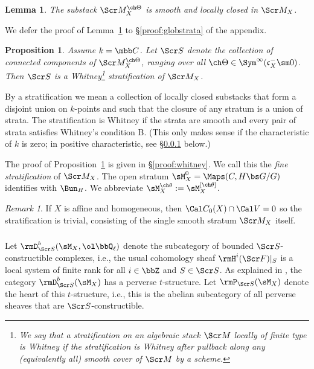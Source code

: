 \documentclass[final]{amsart}
\newtheorem{lem}[subsubsection]{Lemma}
\newtheorem{prop}[subsubsection]{Proposition}
\theoremstyle{remark}
\newtheorem{rem}[subsubsection]{Remark}
\theoremstyle{definition}
\numberwithin{equation}{section}
\begin{document}
\begin{lem} \label{lem:globstrata}
The substack $\Scr M^{\ch\Theta}_X$ is
smooth and locally closed in $\Scr M_X$. 
\end{lem}

We defer the proof of Lemma~\ref{lem:globstrata} to \S\ref{proof:globstrata} of the appendix. 

\medskip
\begin{prop} \label{prop:globwhitney}
Assume $k=\mbb C$. Let $\Scr S$ denote the collection of connected components of 
$\Scr M^{\ch\Theta}_X$, ranging over all 
$\ch\Theta \in \Sym^\infty(\mathfrak c_X^- \sm 0)$. Then $\Scr S$ 
is a Whitney\footnote{We say that a stratification on an algebraic stack $\Scr M$ locally of
finite type is Whitney if the stratification is Whitney after pullback
along any (equivalently all) smooth cover of $\Scr M$ by a scheme.} 
stratification of $\Scr M_X$. 
\end{prop}

By a stratification we mean a collection of locally closed substacks that form a
disjoint union on $k$-points and such that the closure of any stratum is a union of
strata. The stratification is Whitney if the strata are smooth and
every pair of strata satisfies Whitney's condition B. (This only makes sense
if the characteristic of $k$ is zero; in positive characteristic, see 
\S \ref{sect:whitneyperverse} below.)

\smallskip

The proof of Proposition~\ref{prop:globwhitney} is given in \S\ref{proof:whitney}. 
We call this the \emph{fine stratification} of $\Scr M_X$. 
The open stratum $\sM_X^0 = \Maps(C, H\bs G/G)$ identifies
with $\Bun_H$. We abbreviate $\sM_X^{\ch\theta} := \sM_X^{[\ch\theta]}$. 

\begin{rem}
If $X$ is affine and homogeneous, then $\Cal C_0(X) \cap \Cal V = 0$ 
so the stratification is trivial, consisting of
the single smooth stratum $\Scr M_X$ itself.
\end{rem}

\subsubsection{} \label{sect:whitneyperverse}
Let $\rmD^b_{\Scr S}(\sM_X,\ol\bbQ_\ell)$  
denote the subcategory of bounded $\Scr S$-constructible complexes, i.e., 
the usual cohomology sheaf $\rmH^i(\Scr F)|_S$ is a local system
of finite rank for all $i\in\bbZ$ and $S\in\Scr S$. 
As explained in \cite{BBDG}, the category $\rmD^b_{\Scr S}(\sM_X)$ has a 
perverse $t$-structure. Let $\rmP_{\Scr S}(\sM_X)$ denote the heart
of this $t$-structure, i.e., this is the abelian subcategory of all perverse sheaves
that are $\Scr S$-constructible. 
\end{document}
